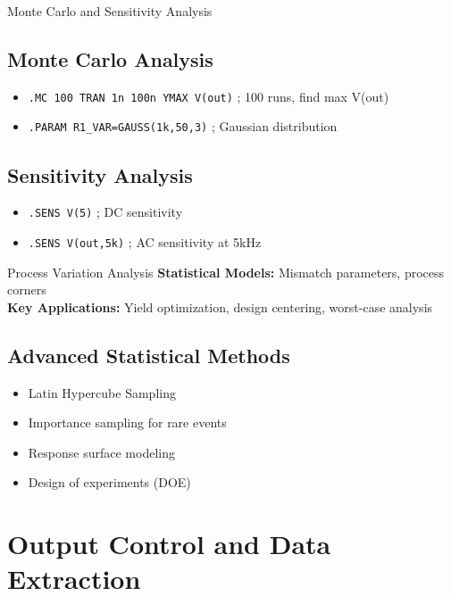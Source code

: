 \documentclass{beamer}
\begin{document}
\begin{frame}{Monte Carlo and Sensitivity Analysis}
    \subsection{Monte Carlo Analysis}
    \begin{itemize}
        \item \texttt{.MC 100 TRAN 1n 100n YMAX V(out)} ; 100 runs, find max V(out)
        \item \texttt{.PARAM R1\_VAR=GAUSS(1k,50,3)} ; Gaussian distribution
    \end{itemize}
    
    \subsection{Sensitivity Analysis}
    \begin{itemize}
        \item \texttt{.SENS V(5)} ; DC sensitivity
        \item \texttt{.SENS V(out,5k)} ; AC sensitivity at 5kHz
    \end{itemize}
    
    \begin{alertblock}{Process Variation Analysis}
        \textbf{Statistical Models:} Mismatch parameters, process corners \\
        \textbf{Key Applications:} Yield optimization, design centering, worst-case analysis
    \end{alertblock}
    
    \subsection{Advanced Statistical Methods}
    \begin{itemize}
        \item Latin Hypercube Sampling
        \item Importance sampling for rare events
        \item Response surface modeling
        \item Design of experiments (DOE)
    \end{itemize}
\end{frame}

\section{Output Control and Data Extraction}
\end{document}
